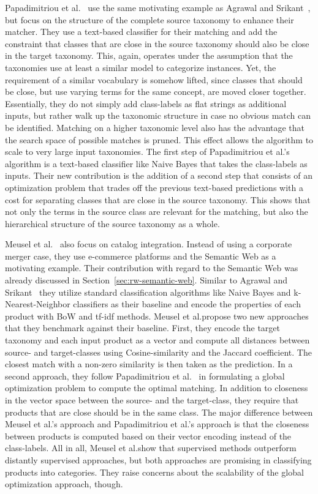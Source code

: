 Papadimitriou et al.\@~\cite{papadimitriou2012taci} use the same motivating example as Agrawal and Srikant~\cite{agrawal2001integrating},
but focus on the structure of the complete source taxonomy to enhance their matcher.
They use a text-based classifier for their matching and add the constraint that classes that are close in the source
taxonomy should also be close in the target taxonomy.
This, again, operates under the assumption that the  taxonomies use at least a similar model to categorize instances.
Yet, the requirement of a similar vocabulary is somehow lifted, since classes that should be close, but use
varying terms for the same concept, are moved closer together.
Essentially, they do not simply add class-labels as flat strings as additional inputs, but rather walk up the taxonomic
structure in case no obvious match can be identified.
Matching on a higher taxonomic level also has the advantage that the search space of possible matches is pruned.
This effect allows the algorithm to  scale to very large input taxonomies.
The first step of Papadimitriou et al.'s algorithm is a text-based classifier like Naive Bayes that takes the class-labels
as inputs.
Their new contribution is the addition of a second step that consists of an optimization problem that trades off the previous text-based
predictions with a cost for separating classes that are close in the source taxonomy.
This shows that not only the terms in the source class are relevant for the matching, but also the hierarchical structure
of the source taxonomy as a whole.

Meusel et al.\@~\cite{meusel2015exploiting} also focus on catalog integration.
Instead of using a corporate merger case, they use e-commerce platforms and the Semantic Web as a motivating example.
Their contribution with regard to the Semantic Web was already discussed in Section~\ref{sec:rw-semantic-web}.
Similar to Agrawal and Srikant~\cite{agrawal2001integrating} they utilize standard classification algorithms like
Naive Bayes and k-Nearest-Neighbor classifiers as their baseline and encode the properties of each product with
BoW and tf-idf methods.
Meusel et al.\@ propose two new approaches that they benchmark against their baseline.
First, they encode the target taxonomy and each input product as a vector and compute all distances between
source- and target-classes using Cosine-similarity and the Jaccard coefficient.
The closest match with a non-zero similarity is then taken as the prediction.
In a second approach, they follow Papadimitriou et al.\@~\cite{papadimitriou2012taci} in formulating a global optimization
problem to compute the optimal matching.
In addition to closeness in the vector space between the source- and the target-class, they require that products
that are close should be in the same class.
The major difference between Meusel et al.'s approach and Papadimitriou et al.'s approach is that the closeness
between products is computed based on their vector encoding instead of the class-labels.
All in all, Meusel et al.\@ show that supervised methods outperform distantly supervised approaches, but both approaches
are promising in classifying products into categories.
They raise concerns about the scalability of the global optimization approach, though.

